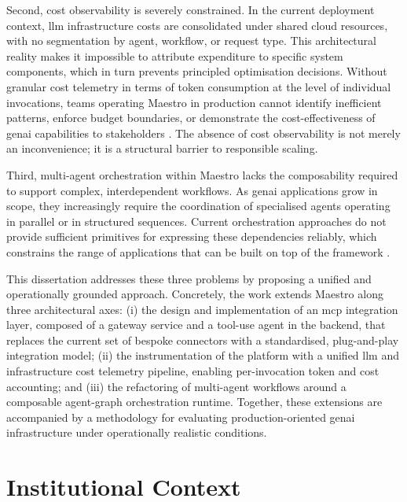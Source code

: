 Second, cost observability is severely constrained. In the current deployment context, \gls{llm} infrastructure costs are consolidated under shared cloud resources, with no segmentation by agent, workflow, or request type. This architectural reality makes it impossible to attribute expenditure to specific system components, which in turn prevents principled optimisation decisions. Without granular cost telemetry in terms of token consumption at the level of individual invocations, teams operating Maestro in production cannot identify inefficient patterns, enforce budget boundaries, or demonstrate the cost-effectiveness of \gls{genai} capabilities to stakeholders \cite{wu2022sustainable}. The absence of cost observability is not merely an inconvenience; it is a structural barrier to responsible scaling.

Third, multi-agent orchestration within Maestro lacks the composability required to support complex, interdependent workflows. As \gls{genai} applications grow in scope, they increasingly require the coordination of specialised agents operating in parallel or in structured sequences. Current orchestration approaches do not provide sufficient primitives for expressing these dependencies reliably, which constrains the range of applications that can be built on top of the framework \cite{wang2023survey}.

This dissertation addresses these three problems by proposing a unified and operationally grounded approach. Concretely, the work extends Maestro along three architectural axes: (i) the design and implementation of an \gls{mcp} integration layer, composed of a gateway service and a tool-use agent in the backend, that replaces the current set of bespoke connectors with a standardised, plug-and-play integration model; (ii) the instrumentation of the platform with a unified \gls{llm} and infrastructure cost telemetry pipeline, enabling per-invocation token and cost accounting; and (iii) the refactoring of multi-agent workflows around a composable agent-graph orchestration runtime. Together, these extensions are accompanied by a methodology for evaluating production-oriented \gls{genai} infrastructure under operationally realistic conditions.


\section{Institutional Context}
\label{sec:institutional-context}

